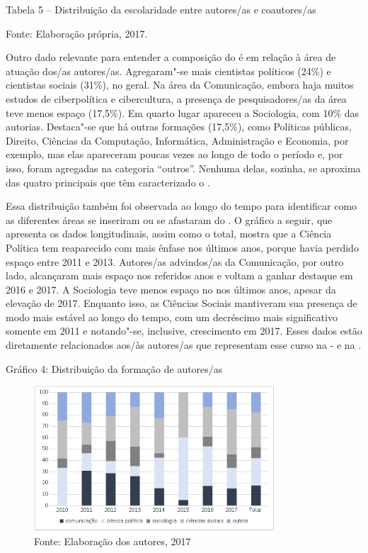 Tabela 5 -- Distribuição da escolaridade entre autores/as e coautores/as

Fonte: Elaboração própria, 2017.

Outro dado relevante para entender a composição do  é em relação à
área de atuação dos/as autores/as. Agregaram"-se mais cientistas
políticos (24\%) e cientistas sociais (31\%), no geral. Na área da
Comunicação, embora haja muitos estudos de ciberpolítica e cibercultura,
a presença de pesquisadores/as da área teve menos espaço (17,5\%). Em
quarto lugar apareceu a Sociologia, com 10\% das autorias. Destaca"-se
que há outras formações (17,5\%), como Políticas públicas, Direito,
Ciências da Computação, Informática, Administração e Economia, por
exemplo, mas elas apareceram poucas vezes ao longo de todo o período e,
por isso, foram agregadas na categoria ``outros''. Nenhuma delas,
sozinha, se aproxima das quatro principais que têm caracterizado o .

Essa distribuição também foi observada ao longo do tempo para
identificar como as diferentes áreas se inseriram ou se afastaram do .
O gráfico a seguir, que apresenta os dados longitudinais, assim como o
total, mostra que a Ciência Política tem reaparecido com mais ênfase nos
últimos anos, porque havia perdido espaço entre 2011 e 2013. Autores/as
advindos/as da Comunicação, por outro lado, alcançaram mais espaço nos
referidos anos e voltam a ganhar destaque em 2016 e 2017. A Sociologia
teve menos espaço no  nos últimos anos, apesar da elevação de 2017.
Enquanto isso, as Ciências Sociais mantiveram sua presença de modo mais
estável ao longo do tempo, com um decréscimo mais significativo somente
em 2011 e notando"-se, inclusive, crescimento em 2017. Esses dados estão
diretamente relacionados aos/às autores/as que representam esse curso na
- e na .

Gráfico 4: Distribuição da formação de autores/as

\begin{figure}[!ht]
\centering
 \includegraphics[width=90mm]{./imgs/graf3_4.png}
\caption{Fonte: Elaboração dos autores, 2017}
\end{figure}

